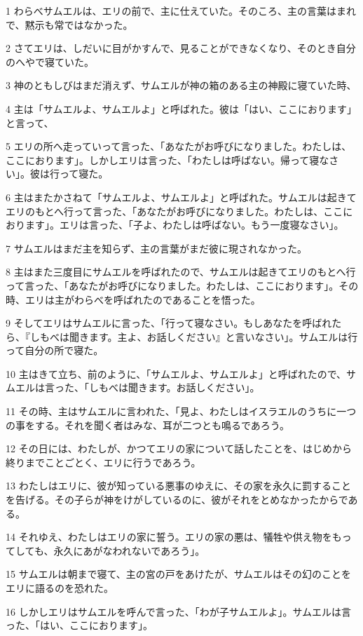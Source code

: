 \par 1 わらべサムエルは、エリの前で、主に仕えていた。そのころ、主の言葉はまれで、黙示も常ではなかった。
\par 2 さてエリは、しだいに目がかすんで、見ることができなくなり、そのとき自分のへやで寝ていた。
\par 3 神のともしびはまだ消えず、サムエルが神の箱のある主の神殿に寝ていた時、
\par 4 主は「サムエルよ、サムエルよ」と呼ばれた。彼は「はい、ここにおります」と言って、
\par 5 エリの所へ走っていって言った、「あなたがお呼びになりました。わたしは、ここにおります」。しかしエリは言った、「わたしは呼ばない。帰って寝なさい」。彼は行って寝た。
\par 6 主はまたかさねて「サムエルよ、サムエルよ」と呼ばれた。サムエルは起きてエリのもとへ行って言った、「あなたがお呼びになりました。わたしは、ここにおります」。エリは言った、「子よ、わたしは呼ばない。もう一度寝なさい」。
\par 7 サムエルはまだ主を知らず、主の言葉がまだ彼に現されなかった。
\par 8 主はまた三度目にサムエルを呼ばれたので、サムエルは起きてエリのもとへ行って言った、「あなたがお呼びになりました。わたしは、ここにおります」。その時、エリは主がわらべを呼ばれたのであることを悟った。
\par 9 そしてエリはサムエルに言った、「行って寝なさい。もしあなたを呼ばれたら、『しもべは聞きます。主よ、お話しください』と言いなさい」。サムエルは行って自分の所で寝た。
\par 10 主はきて立ち、前のように、「サムエルよ、サムエルよ」と呼ばれたので、サムエルは言った、「しもべは聞きます。お話しください」。
\par 11 その時、主はサムエルに言われた、「見よ、わたしはイスラエルのうちに一つの事をする。それを聞く者はみな、耳が二つとも鳴るであろう。
\par 12 その日には、わたしが、かつてエリの家について話したことを、はじめから終りまでことごとく、エリに行うであろう。
\par 13 わたしはエリに、彼が知っている悪事のゆえに、その家を永久に罰することを告げる。その子らが神をけがしているのに、彼がそれをとめなかったからである。
\par 14 それゆえ、わたしはエリの家に誓う。エリの家の悪は、犠牲や供え物をもってしても、永久にあがなわれないであろう」。
\par 15 サムエルは朝まで寝て、主の宮の戸をあけたが、サムエルはその幻のことをエリに語るのを恐れた。
\par 16 しかしエリはサムエルを呼んで言った、「わが子サムエルよ」。サムエルは言った、「はい、ここにおります」。
